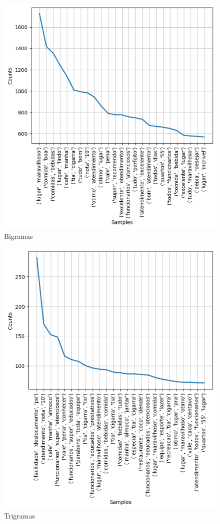 \begin{figure}
	\centering
	\includegraphics[width=1\textwidth]{figs/exploratoria/bigramas.png}
	\caption{Bigramas}
	\label{img:bigramas}
\end{figure}

\begin{figure}
	\centering
	\includegraphics[width=1\textwidth]{figs/exploratoria/trigramas.png}
	\caption{Trigramas}
	\label{img:trigramas}
\end{figure}


